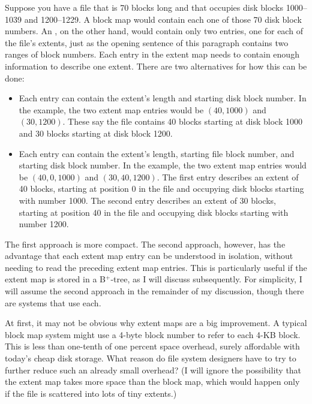 Suppose you have a file that is 70 blocks long and that occupies
disk blocks 1000--1039 and 1200--1229.  A
block map would contain each one of those 70 disk block numbers.  An
, on the other hand, would contain only two
entries, one for each of the file's extents, just as the opening
sentence of this paragraph contains two
ranges of block numbers.  Each entry in the extent
map needs to contain enough information to describe one extent.  There
are two alternatives for how this can be done:
\begin{itemize}
\item
Each entry can contain the extent's length and starting disk block
number.  In the example, the two extent map entries would be $(40,
1000)$ and $(30, 1200)$.  These say the file contains 40 blocks
starting at disk block 1000 and 30 blocks starting at disk block
1200.
\item
Each entry can contain the extent's length, starting file block
number, and starting disk block number.  In the example, the two
extent map entries would be $(40, 0, 1000)$ and $(30, 40, 1200)$.  The
first entry describes an extent of 40 blocks, starting at position 0 in the
file and occupying disk blocks starting with number 1000.  The second entry
describes an extent of 30 blocks, starting
at position 40 in the file and occupying disk blocks starting with number 1200.
\end{itemize}
The first approach is more compact.  The second approach, however, has the
advantage that each extent map entry can be understood in isolation,
without needing to read the preceding extent map entries.  This is
particularly useful if the extent map is stored in a B${}^+$-tree, as I
will discuss subsequently. For simplicity, I will assume the second approach
in the remainder of my discussion, though there are systems that use
each.

At first, it may not be obvious why extent maps are a big improvement.
A typical block map system might use a 4-byte block number to refer
to each 4-KB block.  This is less than one-tenth of one percent space
overhead, surely affordable with today's cheap disk storage.  What
reason do file system designers have to try to further reduce such an already small
overhead?  (I will ignore the possibility that the extent map takes
more space than the block map, which would happen only if the file is
scattered into lots of tiny extents.)

